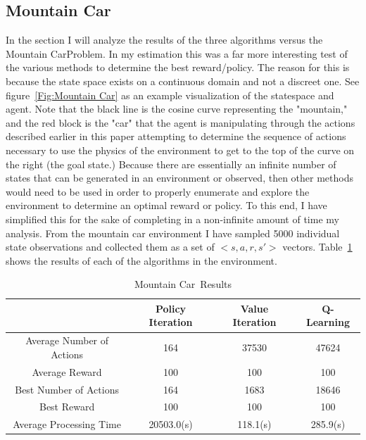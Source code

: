 \documentclass[11pt]{article}
\newcommand{\problemtwo}{Mountain Car}
\begin{document}
    \subsection{\problemtwo}
    In the section I will analyze the results of the three algorithms versus the \problemtwo Problem.
    In my estimation this was a far more interesting test of the various methods to determine the best reward/policy.
    The reason for this is because the state space exists on a continuous domain and not a discreet one.
    See figure~\ref{Fig:Mountain Car} as an example visualization of the statespace and agent.
    Note that the black line is the cosine curve representing the "mountain," and the red block is the "car" that the agent
    is manipulating through the actions described earlier in this paper attempting to determine the sequence of actions
    necessary to use the physics of the environment to get to the top of the curve on the right (the goal state.)
    Because there are essentially an infinite number of states that can be generated in an environment or observed, then
    other methods would need to be used in order to properly enumerate and explore the environment to determine an optimal
    reward or policy.
    To this end, I have simplified this for the sake of completing in a non-infinite amount of time my analysis.
    From the mountain car environment I have sampled 5000 individual state observations and collected them as a set of
    $<s,a,r,s'>$ vectors.
    Table~\ref{tab:\problemtwo~Results} shows the results of each of the algorithms in the environment.
    \begin{table}
        \centering
        \begin{tabular}{|c| c | c | c |}
            \hline
            & Policy Iteration & Value Iteration & Q-Learning \\
            \hline
            \hline
            Average Number of Actions & 164              & 37530           & 47624      \\
            \hline
            Average Reward            & 100              & 100             & 100        \\
            \hline
            Best Number of Actions    & 164              & 1683            & 18646      \\
            \hline
            Best Reward               & 100              & 100             & 100        \\
            \hline
            Average Processing Time   & 20503.0(s)       & 118.1(s)        & 285.9(s)   \\
            \hline
        \end{tabular}
        \caption{\label{tab:\problemtwo~Results}\problemtwo~Results}
    \end{table}
\end{document}

